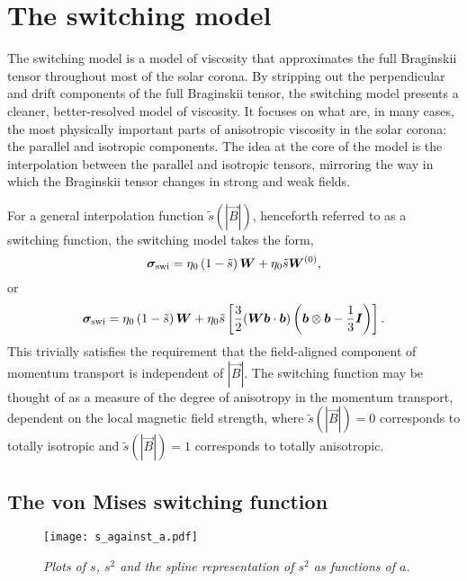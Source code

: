 \section{The switching model}

The switching model is a model of viscosity that approximates the full Braginskii tensor throughout most of the solar corona. By stripping out the perpendicular and drift components of the full Braginskii tensor, the switching model presents a cleaner, better-resolved model of viscosity. It focuses on what are, in many cases, the most physically important parts of anisotropic viscosity in the solar corona: the parallel and isotropic components. The idea at the core of the model is the interpolation between the parallel and isotropic tensors, mirroring the way in which the Braginskii tensor changes in strong and weak fields.

For a general interpolation function $\tilde{s}(|\vec{B}|)$, henceforth referred to as a switching function, the switching model takes the form,
\begin{equation}
  \label{eq:switching_model_simple}
{\bm \sigma}_{\text{swi}} = \eta_0 \left( 1 - \tilde{s} \right) {\bm W} + \eta_0 \tilde{s} {\bm W}^{(0)},
\end{equation}
or
\begin{equation}
  \label{eq:switching_model}
{\bm \sigma}_{\text{swi}} = \eta_0 \left( 1 - \tilde{s} \right) {\bm W} + \eta_0 \tilde{s} \left[\frac{3}{2}({\bm W}{\bm b}\cdot{\bm b}) \left( {\bm b} \otimes {\bm b} - \frac{1}{3}{\bm I} \right)\right].
\end{equation}
This trivially satisfies the requirement that the field-aligned component of momentum transport is independent of $|\vec{B}|$. The switching function may be thought of as a measure of the degree of anisotropy in the momentum transport, dependent on the local magnetic field strength, where $\tilde{s}(|\vec{B}|) = 0$ corresponds to totally isotropic and $\tilde{s}(|\vec{B}|) = 1$ corresponds to totally anisotropic.

\subsection{The von Mises switching function}

\label{sec:switching_function}

\begin{figure}[t]
  \centering
  \texttt{[image: s\_against\_a.pdf]}
  \caption{\emph{Plots of $s$, $s^2$ and the spline representation of $s^2$ as functions of $a$.}}%
  \label{fig:s_against_a}
\end{figure}

